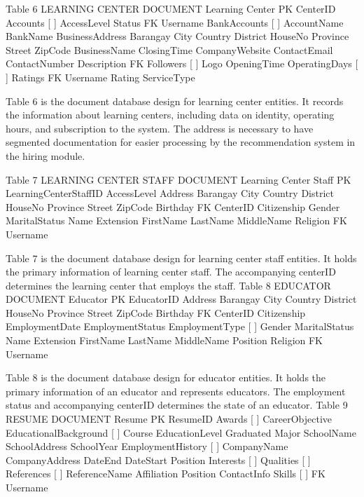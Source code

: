 Table 6
LEARNING CENTER DOCUMENT
Learning Center
PK	CenterID
 	Accounts [ ] { }
 	 	AccessLevel
 		Status
FK		Username
 	BankAccounts [ ] { }
 	 	AccountName
 		BankName
 	BusinessAddress { }
 	 	Barangay
 		City
 		Country
 		District
 		HouseNo
 		Province
 		Street
 		ZipCode
 	BusinessName
 	ClosingTime
 	CompanyWebsite
 	ContactEmail
 	ContactNumber
 	Description
FK	Followers [ ]
 	Logo
 	OpeningTime
 	OperatingDays [ ]
 	Ratings { }
FK	 	Username
 		Rating
 	ServiceType

Table 6 is the document database design for learning center entities. It records the information about learning centers, including data on identity, operating hours, and subscription to the system. The address is necessary to have segmented documentation for easier processing by the recommendation system in the hiring module.



Table 7
LEARNING CENTER STAFF DOCUMENT
Learning Center Staff
PK	LearningCenterStaffID
 	AccessLevel
 	Address { }
 	 	Barangay
 		City
 		Country
 		District
 		HouseNo
 		Province
 		Street
 		ZipCode
 	Birthday
FK	CenterID
 	Citizenship
 	Gender
 	MaritalStatus
 	Name { }
 	 	Extension
 		FirstName
 		LastName
 		MiddleName
 	Religion
FK	Username

Table 7 is the document database design for learning center staff entities. It holds the primary information of learning center staff. The accompanying centerID determines the learning center that employs the staff. 
Table 8
EDUCATOR DOCUMENT
Educator
PK	EducatorID
 	Address { }
 	 	Barangay
 		City
 		Country
 		District
 		HouseNo
 		Province
 		Street
 		ZipCode
 	Birthday
FK	CenterID
 	Citizenship
 	EmploymentDate
 	EmploymentStatus
 	EmploymentType [ ]
 	Gender
 	MaritalStatus
 	Name { }
 	 	Extension
 		FirstName
 		LastName
 		MiddleName
 	Position
 	Religion
FK	Username

Table 8 is the document database design for educator entities. It holds the primary information of an educator and represents educators. The employment status and accompanying centerID determines the state of an educator. 
Table 9
RESUME DOCUMENT
Resume
PK	ResumeID
 	Awards [ ]
 	CareerObjective
 	EducationalBackground [ ] { }
 	 	Course
 		EducationLevel
 		Graduated
 		Major
 		SchoolName
 		SchoolAddress
 		SchoolYear
 	EmploymentHistory [ ] { }
 	 	CompanyName
 		CompanyAddress
 		DateEnd
 		DateStart
 		Position
 	Interests [ ]
 	Qualities [ ]
 	References [ ] { }
 	 	ReferenceName
 		Affiliation
 		Position
 		ContactInfo
 	Skills [ ]
FK	Username

